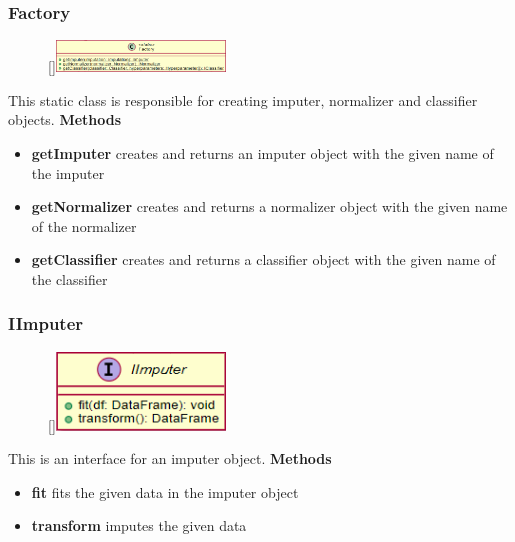 \subsubsection{Factory}
\begin{figure}
    \raisebox{0pt}[\dimexpr{}\baselineskip\relax]{\includegraphics[width=4.5cm]{classes/model-management/8.png}}
\end{figure} 
\par
This static class is responsible for creating imputer, normalizer and classifier objects.
\newline
\newline
\textbf{Methods}
\begin{itemize}
    \item \textbf{getImputer} creates and returns an imputer object with the given name of the imputer
    \item \textbf{getNormalizer} creates and returns a normalizer object with the given name of the normalizer
    \item \textbf{getClassifier} creates and returns a classifier object with the given name of the classifier
\end{itemize}

\subsubsection{IImputer}
\begin{figure}
    \raisebox{0pt}[\dimexpr{}\baselineskip\relax]{\includegraphics[width=4.5cm]{classes/model-management/9.png}}
\end{figure} 
\par
This is an interface for an imputer object.
\newline
\newline
\textbf{Methods}
\begin{itemize}
    \item \textbf{fit} fits the given data in the imputer object
    \item \textbf{transform} imputes the given data
\end{itemize}

